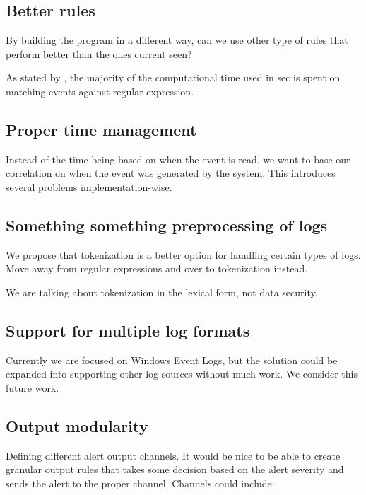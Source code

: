 \subsection{Better rules}
\label{sub:better-rules}

By building the program in a different way, can we use other type of rules that perform better than the ones current seen?

As stated by \textcite{rouillard2004real}, the majority of the computational time used in \acrshort{sec} is spent on matching events against regular expression.

\subsection{Proper time management}
\label{sub:time-management}

Instead of the time being based on when the event is read, we want to base our correlation on when the event was generated by the system. This introduces several problems implementation-wise.

\subsection{Something something preprocessing of logs}

We propose that tokenization is a better option for handling certain types of logs. Move away from regular expressions and over to tokenization instead.

We are talking about tokenization in the lexical form, not data security.

\subsection{Support for multiple log formats}
\label{sub:multiple-log-formats}

Currently we are focused on Windows Event Logs, but the solution could be expanded into supporting other log sources without much work. We consider this future work.

\subsection{Output modularity}
\label{sub:modularity}

Defining different alert output channels. It would be nice to be able to create granular output rules that takes some decision based on the alert severity and sends the alert to the proper channel. Channels could include:

